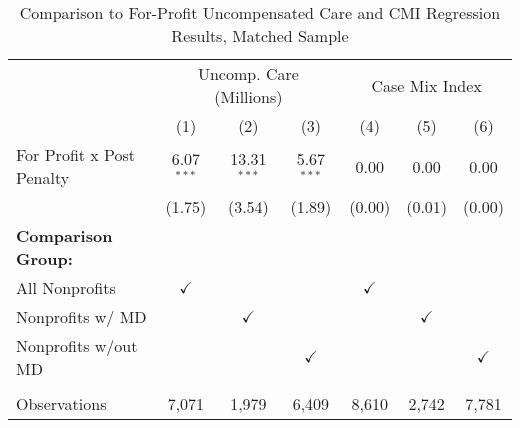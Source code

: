 \begin{table}[htbp]
   \caption{\label{tab:forprofit_uncomp_CMI_matchsample} Comparison to For-Profit Uncompensated Care and CMI Regression Results, Matched Sample}
   \bigskip
   \centering
   \begin{tabular}{lcccccc}
      \toprule
       & \multicolumn{3}{c}{Uncomp. Care (Millions)} & \multicolumn{3}{c}{Case Mix Index}\\
                                  & (1)           & (2)           & (3)           & (4)           & (5)           & (6)\\  
      \midrule 
      For Profit x Post Penalty   & 6.07$^{***}$  & 13.31$^{***}$ & 5.67$^{***}$  & 0.00          & 0.00          & 0.00\\   
                                  & (1.75)        & (3.54)        & (1.89)        & (0.00)        & (0.01)        & (0.00)\\   
      \textbf{Comparison Group:}  &               &               &               &               &               & \\  
      All Nonprofits              & $\checkmark$  &               &               & $\checkmark$  &               & \\  
      Nonprofits w/ MD            &               & $\checkmark$  &               &               & $\checkmark$  & \\  
      Nonprofits w/out MD         &               &               & $\checkmark$  &               &               & $\checkmark$\\   
       \\
      Observations                & 7,071         & 1,979         & 6,409         & 8,610         & 2,742         & 7,781\\  
      \bottomrule
   \end{tabular}
\end{table}

